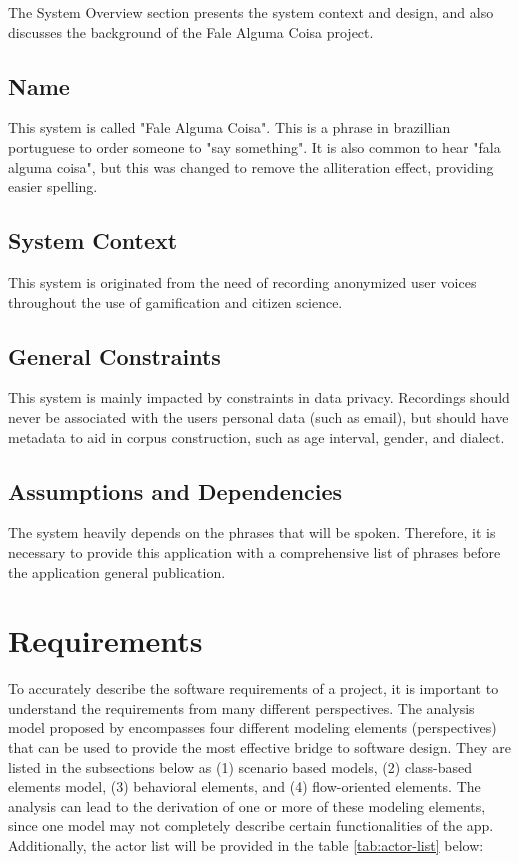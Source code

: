 The System Overview section presents the system context and design, and also discusses the background of the Fale Alguma Coisa project.

\subsection{Name}

This system is called "Fale Alguma Coisa". This is a phrase in brazillian portuguese to order someone to "say something". It is also common to hear "fala alguma coisa", but this was changed to remove the alliteration effect, providing easier spelling.

\subsection{System Context}

This system is originated from the need of recording anonymized user voices throughout the use of gamification and citizen science.

\subsection{General Constraints}

This system is mainly impacted by constraints in data privacy. Recordings should never be associated with the users personal data (such as email), but should have metadata to aid in corpus construction, such as age interval, gender, and dialect.

\subsection{Assumptions and Dependencies}

The system heavily depends on the phrases that will be spoken. Therefore, it is necessary to provide this application with a comprehensive list of phrases before the application general publication.

\section{Requirements}
\label{appendix:srs:requirements}

To accurately describe the software requirements of a project, it is important to understand the requirements from many different perspectives. The analysis model proposed by \cite{pressman2014software} encompasses four different modeling elements (perspectives) that can be used to provide the most effective bridge to software design. They are listed in the subsections below as (1) scenario based models, (2) class-based elements model, (3) behavioral elements, and (4) flow-oriented elements. The analysis can lead to the derivation of one or more of these modeling elements, since one model may not completely describe certain functionalities of the app. Additionally, the actor list will be provided in the table \ref{tab:actor-list} below:

